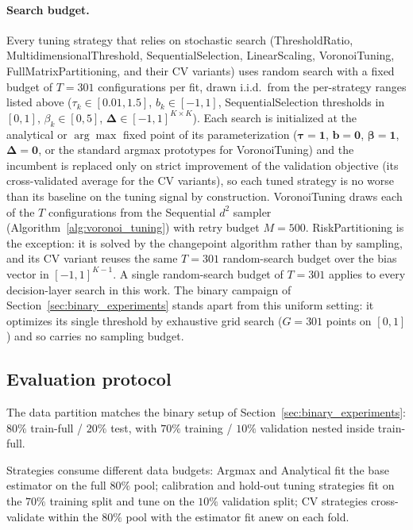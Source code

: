 \paragraph{Search budget.} Every tuning strategy that relies on stochastic search (ThresholdRatio, MultidimensionalThreshold, SequentialSelection, LinearScaling, VoronoiTuning, FullMatrixPartitioning, and their CV variants) uses random search with a fixed budget of $T = 301$ configurations per fit, drawn i.i.d.\ from the per-strategy ranges listed above ($\tau_k \in [0.01, 1.5]$, $b_k \in [-1, 1]$, SequentialSelection thresholds in $[0, 1]$, $\beta_k \in [0, 5]$, $\boldsymbol{\Delta} \in [-1, 1]^{K \times K}$). Each search is initialized at the analytical or $\arg\max$ fixed point of its parameterization ($\boldsymbol{\tau} = \mathbf{1}$, $\mathbf{b} = \mathbf{0}$, $\boldsymbol{\beta} = \mathbf{1}$, $\boldsymbol{\Delta} = \mathbf{0}$, or the standard argmax prototypes for VoronoiTuning) and the incumbent is replaced only on strict improvement of the validation objective (its cross-validated average for the CV variants), so each tuned strategy is no worse than its baseline on the tuning signal by construction. VoronoiTuning draws each of the $T$ configurations from the Sequential $d^2$ sampler (Algorithm~\ref{alg:voronoi_tuning}) with retry budget $M = 500$. RiskPartitioning is the exception: it is solved by the \citet{obrien2008costsensitive} changepoint algorithm rather than by sampling, and its CV variant reuses the same $T = 301$ random-search budget over the bias vector in $[-1, 1]^{K-1}$. A single random-search budget of $T = 301$ applies to every decision-layer search in this work. The binary campaign of Section~\ref{sec:binary_experiments} stands apart from this uniform setting: it optimizes its single threshold by exhaustive grid search ($G = 301$ points on $[0, 1]$) and so carries no sampling budget.

\subsection{Evaluation protocol}
The data partition matches the binary setup of Section~\ref{sec:binary_experiments}: $80\%$ train-full / $20\%$ test, with $70\%$ training / $10\%$ validation nested inside train-full.

Strategies consume different data budgets: Argmax and Analytical fit the base estimator on the full $80\%$ pool; calibration and hold-out tuning strategies fit on the $70\%$ training split and tune on the $10\%$ validation split; CV strategies cross-validate within the $80\%$ pool with the estimator fit anew on each fold.

